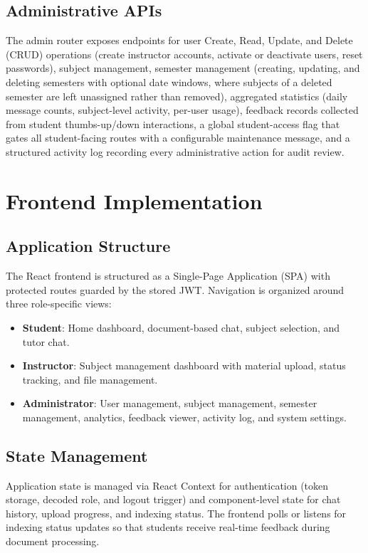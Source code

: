 \documentclass[12pt, a4paper, oneside]{report}
\let\oldsection\section
\renewcommand{\section}{%
  \addtocontents{toc}{\protect\needspace{4\baselineskip}}%
  \oldsection
}
\let\oldsubsection\subsection
\renewcommand{\subsection}{%
  \addtocontents{toc}{\protect\needspace{3\baselineskip}}%
  \oldsubsection
}
\begin{document}
\subsection{Administrative APIs}

The admin router exposes endpoints for user Create, Read, Update, and Delete (CRUD) operations (create instructor accounts, activate or deactivate users, reset passwords), subject management, semester management (creating, updating, and deleting semesters with optional date windows, where subjects of a deleted semester are left unassigned rather than removed), aggregated statistics (daily message counts, subject-level activity, per-user usage), feedback records collected from student thumbs-up/down interactions, a global student-access flag that gates all student-facing routes with a configurable maintenance message, and a structured activity log recording every administrative action for audit review.

\newpage

\section{Frontend Implementation}

\subsection{Application Structure}

The React frontend is structured as a Single-Page Application (SPA) with protected routes guarded by the stored JWT. Navigation is organized around three role-specific views:

\begin{itemize}
  \item \textbf{Student}: Home dashboard, document-based chat, subject selection, and tutor chat.
  \item \textbf{Instructor}: Subject management dashboard with material upload, status tracking, and file management.
  \item \textbf{Administrator}: User management, subject management, semester management, analytics, feedback viewer, activity log, and system settings.
\end{itemize}

\subsection{State Management}

Application state is managed via React Context for authentication (token storage, decoded role, and logout trigger) and component-level state for chat history, upload progress, and indexing status. The frontend polls or listens for indexing status updates so that students receive real-time feedback during document processing.
\end{document}
